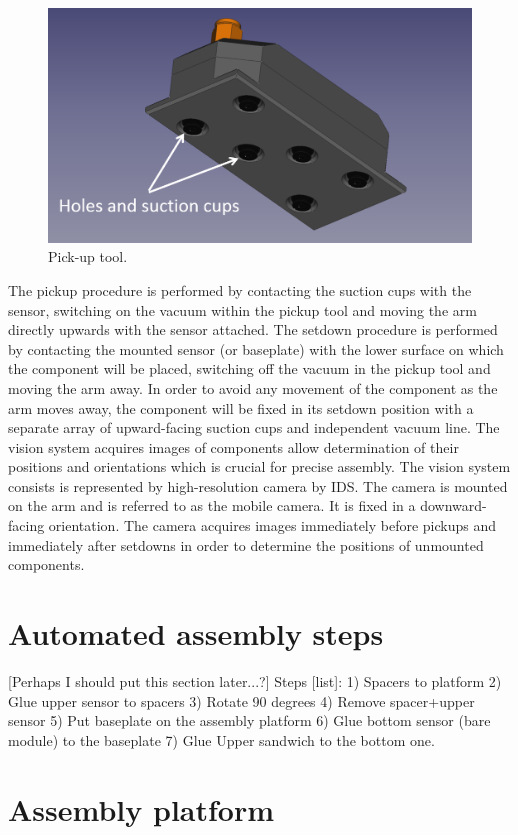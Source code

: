 \begin{figure}[ht]\centering
\includegraphics[width=0.7\linewidth]{Data/Module_assembly/Pick_up_tool.png}
\caption{Pick-up tool.}
\label{fig:pick_up_tool}
\end{figure}

The pickup procedure is performed by contacting the suction cups with the sensor, switching on the vacuum within the pickup tool and moving the arm directly upwards with the sensor attached. The setdown procedure is performed by contacting the mounted sensor (or baseplate) with the lower surface on which the component will be placed, switching off the vacuum in the pickup tool and moving the arm away. In order to avoid any movement of the component as the arm moves away, the component will be fixed in its setdown position with a separate array of upward-facing suction cups and independent vacuum line. The vision system acquires images of components allow determination of their positions and orientations which is crucial for precise assembly. The vision system consists is represented by high-resolution camera by IDS. The camera is mounted on the arm and is referred to as the mobile camera. It is fixed in a downward-facing orientation. The camera acquires images immediately before pickups and immediately after setdowns in order to determine the positions of unmounted components. 

\section{Automated assembly steps}

[Perhaps I should put this section later...?]
Steps [list]:
1) Spacers to platform
2) Glue upper sensor to spacers
3) Rotate 90 degrees
4) Remove spacer+upper sensor
5) Put baseplate on the assembly platform
6) Glue bottom sensor (bare module) to the baseplate
7) Glue Upper sandwich to the bottom one.

\section{Assembly platform}

